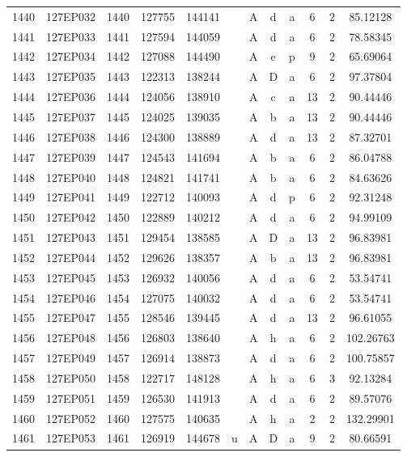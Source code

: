 \begin{tabular}{|*{12}{c|}}
1440 & 127EP032 & 1440 & 127755 & 144141 &  & A & d & a & 6 & 2 & 85.12128 \\ 
1441 & 127EP033 & 1441 & 127594 & 144059 &  & A & d & a & 6 & 2 & 78.58345 \\ 
1442 & 127EP034 & 1442 & 127088 & 144490 &  & A & e & p & 9 & 2 & 65.69064 \\ 
1443 & 127EP035 & 1443 & 122313 & 138244 &  & A & D & a & 6 & 2 & 97.37804 \\ 
1444 & 127EP036 & 1444 & 124056 & 138910 &  & A & c & a & 13 & 2 & 90.44446 \\ 
1445 & 127EP037 & 1445 & 124025 & 139035 &  & A & b & a & 13 & 2 & 90.44446 \\ 
1446 & 127EP038 & 1446 & 124300 & 138889 &  & A & d & a & 13 & 2 & 87.32701 \\ 
1447 & 127EP039 & 1447 & 124543 & 141694 &  & A & b & a & 6 & 2 & 86.04788 \\ 
1448 & 127EP040 & 1448 & 124821 & 141741 &  & A & b & a & 6 & 2 & 84.63626 \\ 
1449 & 127EP041 & 1449 & 122712 & 140093 &  & A & d & p & 6 & 2 & 92.31248 \\ 
1450 & 127EP042 & 1450 & 122889 & 140212 &  & A & d & a & 6 & 2 & 94.99109 \\ 
1451 & 127EP043 & 1451 & 129454 & 138585 &  & A & D & a & 13 & 2 & 96.83981 \\ 
1452 & 127EP044 & 1452 & 129626 & 138357 &  & A & b & a & 13 & 2 & 96.83981 \\ 
1453 & 127EP045 & 1453 & 126932 & 140056 &  & A & d & a & 6 & 2 & 53.54741 \\ 
1454 & 127EP046 & 1454 & 127075 & 140032 &  & A & d & a & 6 & 2 & 53.54741 \\ 
1455 & 127EP047 & 1455 & 128546 & 139445 &  & A & d & a & 13 & 2 & 96.61055 \\ 
1456 & 127EP048 & 1456 & 126803 & 138640 &  & A & h & a & 6 & 2 & 102.26763 \\ 
1457 & 127EP049 & 1457 & 126914 & 138873 &  & A & d & a & 6 & 2 & 100.75857 \\ 
1458 & 127EP050 & 1458 & 122717 & 148128 &  & A & h & a & 6 & 3 & 92.13284 \\ 
1459 & 127EP051 & 1459 & 126530 & 141913 &  & A & d & a & 6 & 2 & 89.57076 \\ 
1460 & 127EP052 & 1460 & 127575 & 140635 &  & A & h & a & 2 & 2 & 132.29901 \\ 
1461 & 127EP053 & 1461 & 126919 & 144678 & u & A & D & a & 9 & 2 & 80.66591 \\ 

\end{tabular}
